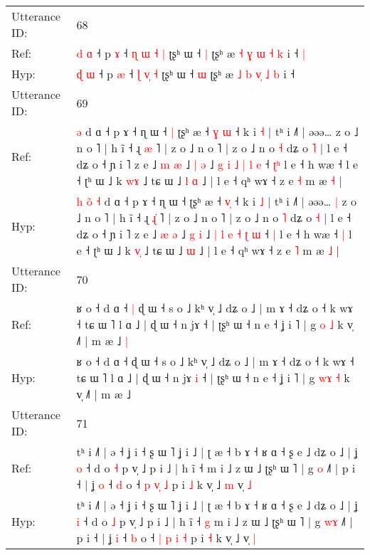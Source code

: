 \documentclass[10pt]{article}
\DeclareRobustCommand{\hl}[1]{{\textcolor{red}{#1}}}
\begin{document}
\begin{longtable}{ll}
 \\
\midrule
Utterance ID: & 68 \\
Ref: & \hl{d} \hl{ɑ} ˧ p \hl{ɤ} ˧ \hl{ɳ} \hl{ɯ}\hl{ }\hl{˧} \hl{|} ʈʂʰ ɯ ˧ \hl{|} ʈʂʰ æ \hl{˧} \hl{ɣ} \hl{}\hl{ɯ} \hl{˧} \hl{k} i ˧\hl{ }\hl{|}
 \\
Hyp: & \hl{ɖ} \hl{ɯ} ˧ p \hl{æ} ˧ \hl{ɭ} \hl{}\hl{v}\hl{̩} \hl{˧} ʈʂʰ ɯ ˧ \hl{ɯ} ʈʂʰ æ \hl{˩} \hl{b} \hl{v}\hl{̩} \hl{˩} \hl{b} i ˧\hl{}\hl{}
 \\
\midrule
Utterance ID: & 69 \\
Ref: & \hl{}\hl{}\hl{}\hl{}\hl{}\hl{ə} d ɑ ˧ p ɤ ˧ ɳ ɯ ˧\hl{ }\hl{|} ʈʂʰ æ ˧ \hl{ɣ}\hl{ }\hl{ɯ} ˧ k i \hl{˧} | tʰ i ˩˥ | əəə…\hl{}\hl{} z o ˩ n o ˥ | h ĩ ˧ ɻ \hl{}\hl{æ} ˥ | z o ˩ n o ˥ | z o ˩ n o \hl{˧} dʑ o \hl{˥} | l e ˧ dʑ o ˧ ɲ i ˥ z e ˩ \hl{m} \hl{æ} ˩ \hl{|} \hl{ə} ˩ \hl{g} \hl{i} \hl{˩} \hl{|} \hl{l} \hl{e} ˧ \hl{ʈ}\hl{ʰ} l e ˧ h wæ ˧\hl{}\hl{} l e ˧ ʈʰ ɯ ˩ k \hl{w}\hl{ɤ} ˩ tɕ ɯ ˩\hl{ }\hl{l} \hl{ɑ} ˩ | l e ˧ qʰ wɤ ˧ z e \hl{˧} m æ \hl{˧} |
 \\
Hyp: & \hl{h}\hl{ }\hl{o}\hl{̃}\hl{ }\hl{˧} d ɑ ˧ p ɤ ˧ ɳ ɯ ˧\hl{}\hl{} ʈʂʰ æ ˧ \hl{}\hl{v}\hl{̩} ˧ k i \hl{˩} | tʰ i ˩˥ | əəə…\hl{ }\hl{|} z o ˩ n o ˥ | h ĩ ˧ ɻ \hl{ɻ}\hl{̍} ˥ | z o ˩ n o ˥ | z o ˩ n o \hl{˥} dʑ o \hl{˧} | l e ˧ dʑ o ˧ ɲ i ˥ z e ˩ \hl{æ} \hl{ə} ˩ \hl{g} \hl{i} ˩ \hl{|} \hl{l} \hl{e} \hl{˧} \hl{ʈ} \hl{ɯ} ˧ \hl{}\hl{|} l e ˧ h wæ ˧\hl{ }\hl{|} l e ˧ ʈʰ ɯ ˩ k \hl{v}\hl{̩} ˩ tɕ ɯ ˩\hl{}\hl{} \hl{ɯ} ˩ | l e ˧ qʰ wɤ ˧ z e \hl{˥} m æ \hl{˩} |
 \\
\midrule
Utterance ID: & 70 \\
Ref: & ʁ o ˧ d ɑ ˧\hl{ }\hl{|} ɖ ɯ ˧ s o ˩ kʰ v̩ ˩ dʑ o ˩ | m ɤ ˧ dʑ o ˧ k wɤ ˧ tɕ ɯ ˥ l ɑ ˩ | ɖ ɯ ˧ n jɤ\hl{}\hl{} ˧ | ʈʂʰ ɯ ˧ n e ˧ ʝ i ˥ | g \hl{}\hl{o} \hl{˩} k v̩ ˩˥ | m æ ˩\hl{ }\hl{|}
 \\
Hyp: & ʁ o ˧ d ɑ ˧\hl{}\hl{} ɖ ɯ ˧ s o ˩ kʰ v̩ ˩ dʑ o ˩ | m ɤ ˧ dʑ o ˧ k wɤ ˧ tɕ ɯ ˥ l ɑ ˩ | ɖ ɯ ˧ n jɤ\hl{ }\hl{i} ˧ | ʈʂʰ ɯ ˧ n e ˧ ʝ i ˥ | g \hl{w}\hl{ɤ} \hl{˧} k v̩ ˩˥ | m æ ˩\hl{}\hl{}
 \\
\midrule
Utterance ID: & 71 \\
Ref: & tʰ i ˩˥ | ə ˧ ʝ i ˧ ʂ ɯ ˥ ʝ i ˩ | ʈ æ ˧ b ɤ ˧ ʁ ɑ ˧ ʂ e ˩ dʑ o ˩ | ʝ \hl{o} ˧ d o \hl{˧} p v̩ ˩ p i ˩ | h ĩ ˧\hl{}\hl{} m i ˩ z ɯ ˩ ʈʂʰ ɯ ˥ | g \hl{}\hl{o} ˩˥ | p i ˧ | ʝ \hl{o} ˧ \hl{d} o ˧ \hl{p} \hl{}\hl{v}\hl{̩} \hl{˩} p i \hl{˩} k v̩ ˩\hl{ }\hl{m} v̩ \hl{˩}
 \\
Hyp: & tʰ i ˩˥ | ə ˧ ʝ i ˧ ʂ ɯ ˥ ʝ i ˩ | ʈ æ ˧ b ɤ ˧ ʁ ɑ ˧ ʂ e ˩ dʑ o ˩ | ʝ \hl{i} ˧ d o \hl{˩} p v̩ ˩ p i ˩ | h ĩ ˧\hl{ }\hl{g} m i ˩ z ɯ ˩ ʈʂʰ ɯ ˥ | g \hl{w}\hl{ɤ} ˩˥ | p i ˧ | ʝ \hl{i} ˧ \hl{b} o ˧ \hl{|} \hl{p}\hl{ }\hl{i} \hl{˧} p i \hl{˧} k v̩ ˩\hl{}\hl{} v̩ \hl{|}

\end{longtable}
\end{document}
